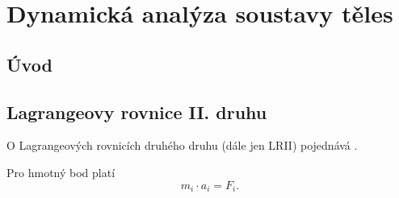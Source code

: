 

\chapter{Dynamická analýza soustavy těles}\label{sec:Dyn_analyza}





\section{Úvod}\label{sec:Uvod_metody}

\lipsum[1]



\section{Lagrangeovy rovnice II. druhu}\label{sec:LR II}

O Lagrangeových rovnicích druhého druhu (dále jen LRII) pojednává \cite{cite:Mech3}.

Pro hmotný bod platí
\begin{equation}
	m_i \cdot a_i = F_i.
\end{equation}

